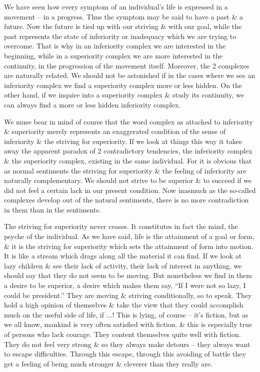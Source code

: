 \documentclass{article}
\numberwithin{equation}{section}
\begin{document}
We have seen how every symptom of an individual's life is expressed in a movement -- in a progress. Thus the symptom may be said to have a past \& a future. Now the future is tied up with our striving \& with our goal, while the past represents the state of inferiority or inadequacy which we are trying to overcome. That is why in an inferiority complex we are interested in the beginning, while in a superiority complex we are more interested in the continuity, in the progression of the movement itself. Moreover, the 2 complexes are naturally related. We should not be astonished if in the cases where we see an inferiority complex we find a superiority complex more or less hidden. On the other hand, if we inquire into a superiority complex \& study its continuity, we can always find a more or less hidden inferiority complex.

We muse bear in mind of course that the word complex as attached to inferiority \& superiority merely represents an exaggerated condition of the sense of inferiority \& the striving for superiority. If we look at things this way it takes away the apparent paradox of 2 contradictory tendencies, the inferiority complex \& the superiority complex, existing in the same individual. For it is obvious that as normal sentiments the striving for superiority \& the feeling of inferiority are naturally complementary. We should not strive to be superior \& to succeed if we did not feel a certain lack in our present condition. Now inasmuch as the so-called complexes develop out of the natural sentiments, there is no more contradiction in them than in the sentiments.

The striving for superiority never ceases. It constitutes in fact the mind, the psyche of the individual. As we have said, life is the attainment of a goal or form, \& it is the striving for superiority which sets the attainment of form into motion. It is like a stream which drags along all the material it can find. If we look at lazy children \& see their lack of activity, their lack of interest in anything, we should say that they do not seem to be moving. But nonetheless we find in them a desire to be superior, a desire which makes them say, ``If I were not so lazy, I could be president.'' They are moving \& striving conditionally, so to speak. They hold a high opinion of themselves \& take the view that they could accomplish much on the useful side of life, if $\ldots$! This is lying, of course -- it's fiction, but as we all know, mankind is very often satisfied with fiction. \& this is especially true of persons who lack courage. They content themselves quite well with fiction. They do not feel very strong \& so they always make detours -- they always want to escape difficulties. Through this escape, through this avoiding of battle they get a feeling of being much stronger \& cleverer than they really are.
\end{document}

